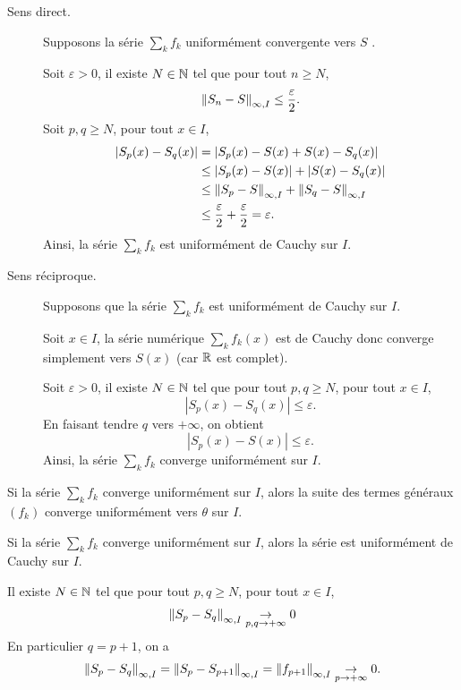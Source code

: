 \documentclass[a4paper, 12pt]{article}
\begin{document}
\begin{demonstration}
    \begin{description}
        \item[Sens direct.] Supposons la série $\sum\limits_k f_k$ uniformément convergente vers $S$ .
        
        Soit $\varepsilon > 0$, il existe $N \in \mathbb{N}$ tel que pour tout $n \geq N$,
        $$
        \left\lVert S_n - S\right\rVert_{\infty, I} \leq \dfrac{\varepsilon}{2}.
        $$
        Soit $p, q \geq N$, pour tout $x \in I$,
        \begin{align*}
            |S_p(x) - S_q(x)| &= |S_p(x) - S(x) + S(x) - S_q(x)| \\
            &\leq |S_p(x) - S(x)| + |S(x) - S_q(x)| \\
            &\leq \left\lVert S_p - S\right\rVert_{\infty, I} + \left\lVert S_q - S\right\rVert_{\infty, I} \\
            &\leq \dfrac{\varepsilon}{2} + \dfrac{\varepsilon}{2} = \varepsilon.
        \end{align*}
        Ainsi, la série $\sum\limits_k f_k$ est uniformément de Cauchy sur $I$.

        \item[Sens réciproque.] Supposons que la série $\sum\limits_k f_k$ est uniformément de Cauchy sur $I$.
        
        Soit $x \in I$, la série numérique $\sum\limits_k f_k(x)$ est de Cauchy donc converge simplement vers $S(x)$ (car $\mathbb{R}$ est complet).
        
        Soit $\varepsilon > 0$, il existe $N \in \mathbb{N}$ tel que pour tout $p, q \geq N$, pour tout $x \in I$,
        $$
        |S_p(x) - S_q(x)| \leq \varepsilon.
        $$
        En faisant tendre $q$ vers $+\infty$, on obtient
        $$
        |S_p(x) - S(x)| \leq \varepsilon.
        $$
        Ainsi, la série $\sum\limits_k f_k$ converge uniformément sur $I$.
    \end{description}
\end{demonstration}

\begin{proposition}{}{}
    Si la série $\sum\limits_k f_k$ converge uniformément sur $I$, alors la suite des termes généraux $(f_k)$ converge uniformément vers $\theta$ sur $I$.
\end{proposition}

\begin{demonstration}
    Si la série $\sum\limits_k f_k$ converge uniformément sur $I$, alors la série est uniformément de Cauchy sur $I$.
    
    Il existe $N \in \mathbb{N}$ tel que pour tout $p, q \geq N$, pour tout $x \in I$,
    $$
    \left\lVert S_p - S_q\right\rVert_{\infty, I} \underset{p, q \to +\infty}{\to} 0
    $$
    En particulier $q = p + 1$, on a
    $$
    \left\lVert S_p - S_q\right\rVert_{\infty, I} = \left\lVert S_p - S_{p+1}\right\rVert_{\infty, I} = \left\lVert f_{p+1}\right\rVert_{\infty, I} \underset{p \to +\infty}{\to} 0.
    $$
\end{demonstration}
\end{document}
